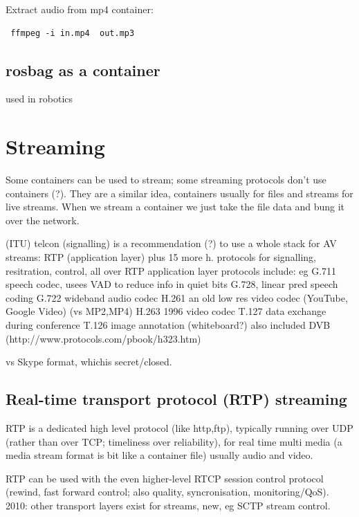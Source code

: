 \documentclass[oneside,english]{scrbook}
\begin{document}

Extract audio from mp4 container:
\begin{lstlisting}
 ffmpeg -i in.mp4  out.mp3
\end{lstlisting}


\section{rosbag as a container}
used in robotics




\chapter{Streaming}
Some containers can be used to stream; some streaming protocols don't use containers (?). They are a similar idea, containers usually for files and streams for live streams. When we stream a container we just take the file data and bung it over the network.

 (ITU) telcon  (signalling)
	is a recommendation (?) to use a whole stack for AV streams:
		RTP (application layer)		
		plus 15 more h. protocols for signalling, resitration, control, all over RTP
		application layer protocols include:
			eg G.711 speech codec, usees VAD to reduce info in quiet bits
			    G.728, linear pred speech coding
			G.722 wideband audio codec
			H.261 an old low res video codec (YouTube, Google Video) (vs MP2,MP4)
			H.263 1996 video codec
			T.127 data exchange during conference
			T.126 image annotation (whiteboard?)
		also included DVB
		(http://www.protocols.com/pbook/h323.htm)

vs Skype format, whichis secret/closed.

\section{Real-time transport protocol (RTP) streaming}

RTP is a dedicated high level protocol (like http,ftp), typically running over UDP (rather than over TCP; timeliness over reliability), for real time multi media (a media stream format is bit like a container file) usually audio and video.

RTP can be used with the even higher-level RTCP session control protocol (rewind, fast forward control; also quality, syncronisation, monitoring/QoS).   2010: other transport layers exist for streams, new, eg SCTP stream control.
\end{document}
